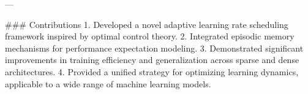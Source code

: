 ---

### Contributions  
1. Developed a novel adaptive learning rate scheduling framework inspired by optimal control theory.  
2. Integrated episodic memory mechanisms for performance expectation modeling.  
3. Demonstrated significant improvements in training efficiency and generalization across sparse and dense architectures.  
4. Provided a unified strategy for optimizing learning dynamics, applicable to a wide range of machine learning models.